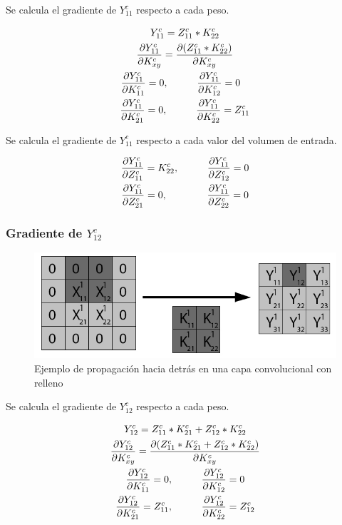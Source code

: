 Se calcula el gradiente de $Y^c_{11}$ respecto a cada peso.

\begin{gather}
	Y^c_{11} = Z^c_{11} * K^c_{22} \\
	\frac{\partial Y^c_{11}}{\partial K^c_{xy}} = \frac{\partial (Z^c_{11} * K^c_{22})}{\partial K^c_{xy}} \\
	\frac{\partial Y^c_{11}}{\partial K^c_{11}} = 0, \hspace{10mm} \frac{\partial Y^c_{11}}{\partial K^c_{12}} = 0 \hspace{3mm} \\
	\frac{\partial Y^c_{11}}{\partial K^c_{21}} = 0, \hspace{10mm} \frac{\partial Y^c_{11}}{\partial K^c_{22}} = Z^c_{11}
\end{gather}

Se calcula el gradiente de $Y^c_{11}$ respecto a cada valor del volumen de entrada.

\begin{gather}
	\frac{\partial Y^c_{11}}{\partial Z^c_{11}} = K^c_{22}, \hspace{10mm} \frac{\partial Y^c_{11}}{\partial Z^c_{12}} = 0\\
	\frac{\partial Y^c_{11}}{\partial Z^c_{21}} = 0, \hspace{14mm} \frac{\partial Y^c_{11}}{\partial Z^c_{22}} = 0
\end{gather}


\subsubsection{Gradiente de $Y^c_{12}$}

\begin{figure}[H]
	\centering
	\includegraphics[width=0.8\linewidth]{imagenes/conv_back_padding_2.jpg} 
	\caption{Ejemplo de propagación hacia detrás en una capa convolucional con relleno}
\end{figure}

Se calcula el gradiente de $Y^c_{12}$ respecto a cada peso.

\begin{gather}
	Y^c_{12} = Z^c_{11} * K^c_{21} + Z^c_{12} * K^c_{22} \\
	\frac{\partial Y^c_{12}}{\partial K^c_{xy}} = \frac{\partial (Z^c_{11} * K^c_{21} + Z^c_{12} * K^c_{22})}{\partial K^c_{xy}} \\
	\frac{\partial Y^c_{12}}{\partial K^c_{11}} = 0, \hspace{10mm} \frac{\partial Y^c_{12}}{\partial K^c_{12}} = 0 \\
	\frac{\partial Y^c_{12}}{\partial K^c_{21}} = Z^c_{11}, \hspace{10mm} \frac{\partial Y^c_{12}}{\partial K^c_{22}} = Z^c_{12}
\end{gather}

